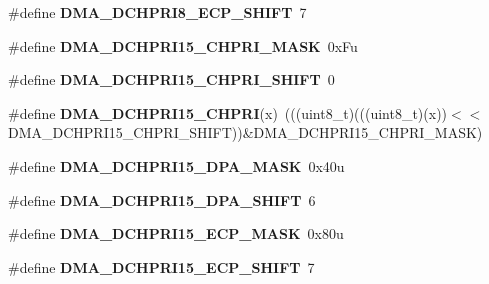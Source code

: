 \begin{DoxyCompactItemize}
\item 
\#define {\bfseries D\+M\+A\+\_\+\+D\+C\+H\+P\+R\+I8\+\_\+\+E\+C\+P\+\_\+\+S\+H\+I\+FT}~7\hypertarget{group__DMA__Register__Masks_ga0717f20f481144abf2d14c7d9c67e289}{}\label{group__DMA__Register__Masks_ga0717f20f481144abf2d14c7d9c67e289}

\item 
\#define {\bfseries D\+M\+A\+\_\+\+D\+C\+H\+P\+R\+I15\+\_\+\+C\+H\+P\+R\+I\+\_\+\+M\+A\+SK}~0x\+Fu\hypertarget{group__DMA__Register__Masks_ga9dff6549497c3518454e82bb9f5c88a9}{}\label{group__DMA__Register__Masks_ga9dff6549497c3518454e82bb9f5c88a9}

\item 
\#define {\bfseries D\+M\+A\+\_\+\+D\+C\+H\+P\+R\+I15\+\_\+\+C\+H\+P\+R\+I\+\_\+\+S\+H\+I\+FT}~0\hypertarget{group__DMA__Register__Masks_ga5e81f55c9806dcfa91352c763197b4cd}{}\label{group__DMA__Register__Masks_ga5e81f55c9806dcfa91352c763197b4cd}

\item 
\#define {\bfseries D\+M\+A\+\_\+\+D\+C\+H\+P\+R\+I15\+\_\+\+C\+H\+P\+RI}(x)~(((uint8\+\_\+t)(((uint8\+\_\+t)(x))$<$$<$D\+M\+A\+\_\+\+D\+C\+H\+P\+R\+I15\+\_\+\+C\+H\+P\+R\+I\+\_\+\+S\+H\+I\+FT))\&D\+M\+A\+\_\+\+D\+C\+H\+P\+R\+I15\+\_\+\+C\+H\+P\+R\+I\+\_\+\+M\+A\+SK)\hypertarget{group__DMA__Register__Masks_ga6deef7b34df8edee0b7ad30775cefbbe}{}\label{group__DMA__Register__Masks_ga6deef7b34df8edee0b7ad30775cefbbe}

\item 
\#define {\bfseries D\+M\+A\+\_\+\+D\+C\+H\+P\+R\+I15\+\_\+\+D\+P\+A\+\_\+\+M\+A\+SK}~0x40u\hypertarget{group__DMA__Register__Masks_ga3b39c6e0610362d59e6ff055e29f0192}{}\label{group__DMA__Register__Masks_ga3b39c6e0610362d59e6ff055e29f0192}

\item 
\#define {\bfseries D\+M\+A\+\_\+\+D\+C\+H\+P\+R\+I15\+\_\+\+D\+P\+A\+\_\+\+S\+H\+I\+FT}~6\hypertarget{group__DMA__Register__Masks_gad352f5ccc0fe19ea638ea2430ccc3afb}{}\label{group__DMA__Register__Masks_gad352f5ccc0fe19ea638ea2430ccc3afb}

\item 
\#define {\bfseries D\+M\+A\+\_\+\+D\+C\+H\+P\+R\+I15\+\_\+\+E\+C\+P\+\_\+\+M\+A\+SK}~0x80u\hypertarget{group__DMA__Register__Masks_ga61fa9d2c60ec0993ecf63e1a3ed62e79}{}\label{group__DMA__Register__Masks_ga61fa9d2c60ec0993ecf63e1a3ed62e79}

\item 
\#define {\bfseries D\+M\+A\+\_\+\+D\+C\+H\+P\+R\+I15\+\_\+\+E\+C\+P\+\_\+\+S\+H\+I\+FT}~7\hypertarget{group__DMA__Register__Masks_ga54aaf25e501504bf8a36a571670118c2}{}\label{group__DMA__Register__Masks_ga54aaf25e501504bf8a36a571670118c2}


\end{DoxyCompactItemize}
